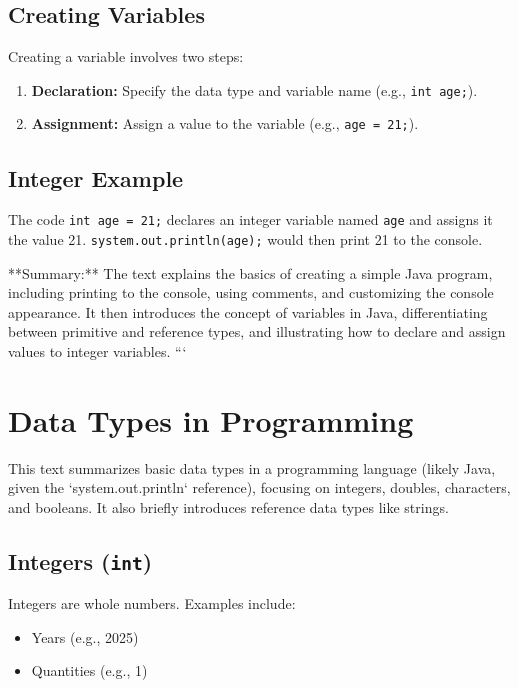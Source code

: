 \documentclass{article}
\begin{document}
\subsection{Creating Variables}

Creating a variable involves two steps:

\begin{enumerate}
    \item \textbf{Declaration:} Specify the data type and variable name (e.g., \texttt{int age;}).
    \item \textbf{Assignment:} Assign a value to the variable (e.g., \texttt{age = 21;}).
\end{enumerate}

\subsection{Integer Example}

The code \texttt{int age = 21;} declares an integer variable named \texttt{age} and assigns it the value 21.  \texttt{system.out.println(age);} would then print 21 to the console.



**Summary:** The text explains the basics of creating a simple Java program, including printing to the console, using comments, and customizing the console appearance.  It then introduces the concept of variables in Java, differentiating between primitive and reference types, and illustrating how to declare and assign values to integer variables.
```


\section{Data Types in Programming}

This text summarizes basic data types in a programming language (likely Java, given the `system.out.println` reference), focusing on integers, doubles, characters, and booleans.  It also briefly introduces reference data types like strings.

\subsection{Integers (\texttt{int})}

Integers are whole numbers.  Examples include:

\begin{itemize}
    \item Years (e.g., 2025)
    \item Quantities (e.g., 1)
\end{itemize}
\end{document}
